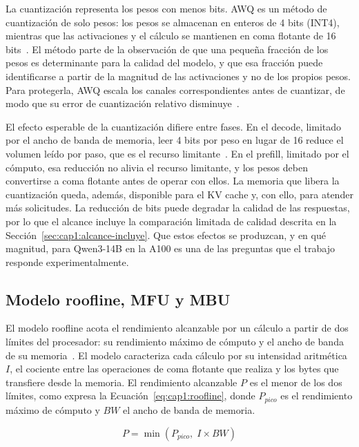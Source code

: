 La cuantización representa los pesos con menos bits. AWQ es un método de cuantización de solo pesos: los pesos se almacenan en enteros de 4 bits (INT4), mientras que las activaciones y el cálculo se mantienen en coma flotante de 16 bits~\cite{lin2024awq}. El método parte de la observación de que una pequeña fracción de los pesos es determinante para la calidad del modelo, y que esa fracción puede identificarse a partir de la magnitud de las activaciones y no de los propios pesos. Para protegerla, AWQ escala los canales correspondientes antes de cuantizar, de modo que su error de cuantización relativo disminuye~\cite{lin2024awq}.

El efecto esperable de la cuantización difiere entre fases. En el decode, limitado por el ancho de banda de memoria, leer 4 bits por peso en lugar de 16 reduce el volumen leído por paso, que es el recurso limitante~\cite{lin2024awq}. En el prefill, limitado por el cómputo, esa reducción no alivia el recurso limitante, y los pesos deben convertirse a coma flotante antes de operar con ellos. La memoria que libera la cuantización queda, además, disponible para el KV cache y, con ello, para atender más solicitudes. La reducción de bits puede degradar la calidad de las respuestas, por lo que el alcance incluye la comparación limitada de calidad descrita en la Sección~\ref{sec:cap1:alcance-incluye}. Que estos efectos se produzcan, y en qué magnitud, para Qwen3-14B en la A100 es una de las preguntas que el trabajo responde experimentalmente.

\subsection{Modelo roofline, MFU y MBU}
\label{sec:cap1:roofline}

El modelo roofline acota el rendimiento alcanzable por un cálculo a partir de dos límites del procesador: su rendimiento máximo de cómputo y el ancho de banda de su memoria~\cite{williams2009roofline}. El modelo caracteriza cada cálculo por su intensidad aritmética $I$, el cociente entre las operaciones de coma flotante que realiza y los bytes que transfiere desde la memoria. El rendimiento alcanzable $P$ es el menor de los dos límites, como expresa la Ecuación~\ref{eq:cap1:roofline}, donde $P_{pico}$ es el rendimiento máximo de cómputo y $BW$ el ancho de banda de memoria.

\begin{equation}
\label{eq:cap1:roofline}
P = \min\left(P_{pico},\; I \times BW\right)
\end{equation}

